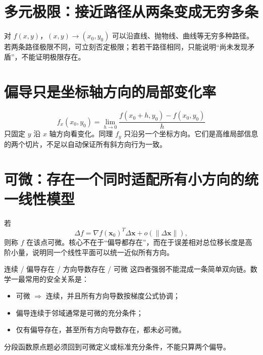 \documentclass[11pt,a4paper,openany]{ctexbook}
\begin{document}
\section{多元极限：接近路径从两条变成无穷多条}
对 $f(x,y)$，$(x,y)\to(x_0,y_0)$ 可以沿直线、抛物线、曲线等无穷多种路径。若两条路径极限不同，可立刻否定极限；若若干路径相同，只能说明“尚未发现矛盾”，不能证明极限存在。

\section{偏导只是坐标轴方向的局部变化率}
\[
f_x(x_0,y_0)=\lim_{h\to0}\frac{f(x_0+h,y_0)-f(x_0,y_0)}{h}
\]
只固定 $y$ 沿 $x$ 轴方向看变化。同理 $f_y$ 只沿另一个坐标方向。它们是高维局部信息的两个切片，不足以自动保证所有斜方向行为一致。

\section{可微：存在一个同时适配所有小方向的统一线性模型}
若
\[
\Delta f=\nabla f(\bm x_0)^T\Delta\bm x+o(\lVert\Delta\bm x\rVert),
\]
则称 $f$ 在该点可微。核心不在于“偏导都存在”，而在于误差相对总位移长度是高阶小量，说明同一个线性平面可以统一近似所有方向。

\begin{boundarybox}{连续 / 偏导存在 / 方向导数存在 / 可微}
这四者强弱不能混成一条简单双向链。数学一最常用的安全关系是：
\begin{itemize}
  \item 可微 $\Rightarrow$ 连续，并且所有方向导数按梯度公式协调；
  \item 偏导连续于邻域通常是可微的充分条件；
  \item 仅有偏导存在，甚至所有方向导数存在，都未必可微。
\end{itemize}
分段函数原点题必须回到可微定义或标准充分条件，不能只算两个偏导。
\end{boundarybox}
\end{document}
